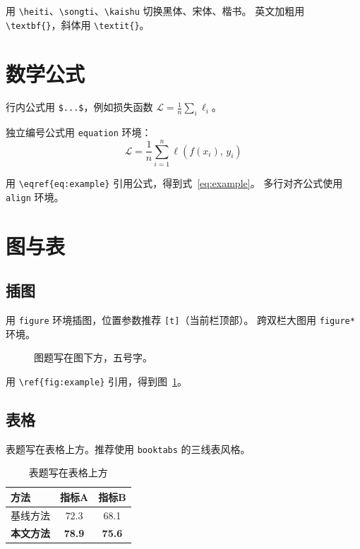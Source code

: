 \documentclass[10pt, twocolumn, a4paper]{article}
\begin{document}
用 \verb|\heiti|、\verb|\songti|、\verb|\kaishu| 切换黑体、宋体、楷书。
英文加粗用 \verb|\textbf{}|，斜体用 \verb|\textit{}|。

\section{数学公式}

行内公式用 \verb|$...$|，例如损失函数 $\mathcal{L} = \frac{1}{n}\sum_i \ell_i$。

独立编号公式用 \texttt{equation} 环境：
\begin{equation}
  \mathcal{L} = \frac{1}{n}\sum_{i=1}^{n} \ell\!\left(f(x_i),\, y_i\right)
  \label{eq:example}
\end{equation}

用 \verb|\eqref{eq:example}| 引用公式，得到式~\eqref{eq:example}。
多行对齐公式使用 \texttt{align} 环境。

\section{图与表}

\subsection{插图}

用 \texttt{figure} 环境插图，位置参数推荐 \verb|[t]|（当前栏顶部）。
跨双栏大图用 \verb|figure*| 环境。

\begin{figure}[t]
  \centering
  \fbox{\rule{0pt}{2.5cm}\rule{\linewidth}{0pt}}
  \caption{图题写在图下方，五号字。}
  \label{fig:example}
\end{figure}

用 \verb|\ref{fig:example}| 引用，得到图~\ref{fig:example}。

\subsection{表格}

表题写在表格上方。推荐使用 \texttt{booktabs} 的三线表风格。

\begin{table}[t]
  \centering
  \caption{表题写在表格上方}
  \label{tab:example}
  \begin{tabular}{lcc}
    \toprule
    方法 & 指标A & 指标B \\
    \midrule
    基线方法 & 72.3 & 68.1 \\
    \textbf{本文方法} & \textbf{78.9} & \textbf{75.6} \\
    \bottomrule
  \end{tabular}
\end{table}
\end{document}
